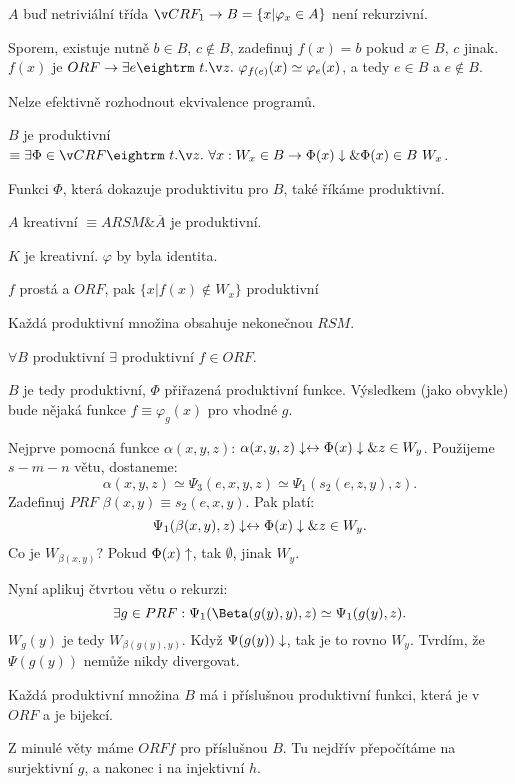  $A$ buď netriviální třída $ČRF_1 \then B = \{x | \varphi_x \in A\}$ není rekurzivní.

\prf{} Sporem, existuje nutně $b \in B$, $c \not \in B$, zadefinuj $f(x) = b$ pokud $x \in B$, $c$ jinak.
$f(x)$ je $ORF \then \exists e \st \varphi_{f(e)}(x) \simeq \varphi_e(x)$, a tedy $e \in B$ a $e \not \in B$.

\res{} Nelze efektivně rozhodnout ekvivalence programů.


\dfn $B$ je produktivní $\equiv \exists \Phi \in ČRF \st \forall x: W_x \in B \then \Phi(x) \da \& \Phi(x) \in B \ W_x$.

\dfn Funkci $\Phi$, která dokazuje produktivitu pro $B$, také říkáme produktivní.

\dfn $A$ kreativní $\equiv A RSM \& \overline{A}$ je produktivní.

\obs{} $K$ je kreativní. $\varphi$ by byla identita.

\obs{} $f$ prostá a $ORF$, pak $\{x | f(x) \not \in W_x\}$ produktivní

\obs{} Každá produktivní množina obsahuje nekonečnou $RSM$. 

 $\forall B$ produktivní $\exists$ produktivní $f \in ORF$.

\prf{}
$B$ je tedy produktivní, $\Phi$ přiřazená produktivní funkce. Výsledkem (jako obvykle) bude
nějaká funkce $f \equiv \varphi_g(x)$ pro vhodné $g$.

Nejprve pomocná funkce $\alpha(x,y,z)$: $\alpha(x,y,z)\downarrow \leftrightarrow \Phi(x)\downarrow \& z \in W_y$.
Použijeme $s-m-n$ větu, dostaneme:
$$ \alpha(x,y,z) \simeq \Psi_3(e,x,y,z) \simeq \Psi_1(s_2(e,z,y),z).$$
Zadefinuj $PRF$ $\beta(x,y) \equiv s_2(e,x,y)$. Pak platí:
$$ \Psi_1(\beta(x,y),z) \downarrow \leftrightarrow \Phi(x)\downarrow \& z \in W_y. $$
Co je $W_{\beta(x,y)}$? Pokud $\Phi(x) \uparrow$, tak $\emptyset$, jinak $W_y$.

Nyní aplikuj čtvrtou větu o rekurzi:
$$ \exists g \in PRF: \Psi_1(\Beta(g(y),y),z) \simeq \Psi_1(g(y),z). $$
$W_g(y)$ je tedy $W_{\beta(g(y),y)}$. Když $\Psi(g(y)) \downarrow$, tak je to rovno $W_y$. 
Tvrdím, že $\Psi(g(y))$ nemůže nikdy divergovat.
 
Každá produktivní množina $B$ má i příslušnou produktivní funkci, která je v $ORF$ a je bijekcí.

\prf{} Z minulé věty máme $ORF f$ pro příslušnou $B$. Tu nejdřív přepočítáme na surjektivní $g$,
a nakonec i na injektivní $h$.

